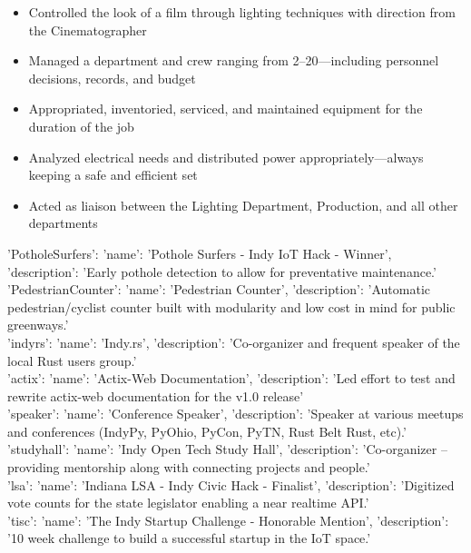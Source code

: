 \documentclass[letterpaper]{article}        %
\begin{document}
  \begin{itemize}
  
  \item Controlled the look of a film through lighting techniques with direction from the Cinematographer
  
  \item Managed a department and crew ranging from 2--20---including personnel decisions, records, and budget
  
  \item Appropriated, inventoried, serviced, and maintained equipment for the duration of the job
  
  \item Analyzed electrical needs and distributed power appropriately---always keeping a safe and efficient set
  
  \item Acted as liaison between the Lighting Department, Production, and all other departments
  
  \end{itemize}
  
  
  
  
  



  \begin{description}
    \item[{'PotholeSurfers': {'name': 'Pothole Surfers - Indy IoT Hack - Winner', 'description': 'Early pothole detection to allow for preventative maintenance.'}}] 
    \item[{'PedestrianCounter': {'name': 'Pedestrian Counter', 'description': 'Automatic pedestrian/cyclist counter built with modularity and low cost in mind for public greenways.'}}] 
    \item[{'indyrs': {'name': 'Indy.rs', 'description': 'Co-organizer and frequent speaker of the local Rust users group.'}}] 
    \item[{'actix': {'name': 'Actix-Web Documentation', 'description': 'Led effort to test and rewrite actix-web documentation for the v1.0 release'}}] 
    \item[{'speaker': {'name': 'Conference Speaker', 'description': 'Speaker at various meetups and conferences (IndyPy, PyOhio, PyCon, PyTN, Rust Belt Rust, etc).'}}] 
    \item[{'studyhall': {'name': 'Indy Open Tech Study Hall', 'description': 'Co-organizer -- providing mentorship along with connecting projects and people.'}}] 
    \item[{'lsa': {'name': 'Indiana LSA - Indy Civic Hack - Finalist', 'description': 'Digitized vote counts for the state legislator enabling a near realtime API.'}}] 
    \item[{'tisc': {'name': 'The Indy Startup Challenge - Honorable Mention', 'description': '10 week challenge to build a successful startup in the IoT space.'}}] 
    
  \end{description}
\end{document}
